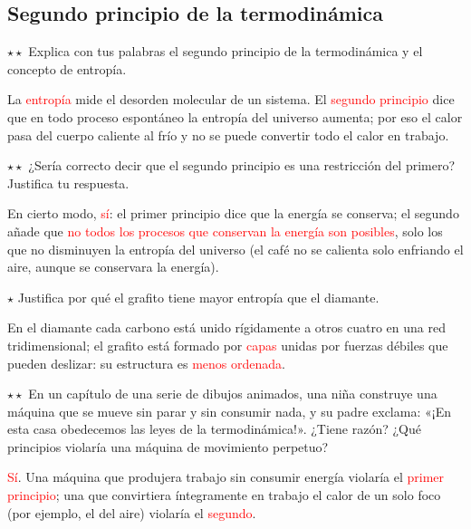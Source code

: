\subsection{Segundo principio de la termodinámica}

\begin{exercise}
    \(\star\star\) Explica con tus palabras el segundo principio de la termodinámica y el concepto de entropía.
    \begin{solu}
        La \textcolor{red}{entropía} mide el desorden molecular de un sistema. El \textcolor{red}{segundo principio} dice que en todo
        proceso espontáneo la entropía del universo aumenta; por eso el calor pasa del cuerpo caliente al frío y no se puede convertir
        todo el calor en trabajo.
    \end{solu}
\end{exercise}

\begin{exercise}
    \(\star\star\) ¿Sería correcto decir que el segundo principio es una restricción del primero? Justifica tu respuesta.
    \begin{solu}
        En cierto modo, \textcolor{red}{sí}: el primer principio dice que la energía se conserva; el segundo añade que
        \textcolor{red}{no todos los procesos que conservan la energía son posibles}, solo los que no disminuyen la entropía del
        universo (el café no se calienta solo enfriando el aire, aunque se conservara la energía).
    \end{solu}
\end{exercise}

\begin{exercise}
    \(\star\) Justifica por qué el grafito tiene mayor entropía que el diamante.
    \begin{solu}
        En el diamante cada carbono está unido rígidamente a otros cuatro en una red tridimensional; el grafito está formado por
        \textcolor{red}{capas} unidas por fuerzas débiles que pueden deslizar: su estructura es \textcolor{red}{menos ordenada}.
    \end{solu}
\end{exercise}

\begin{exercise}
    \(\star\star\) En un capítulo de una serie de dibujos animados, una niña construye una máquina que se mueve sin parar y sin
    consumir nada, y su padre exclama: «¡En esta casa obedecemos las leyes de la termodinámica!». ¿Tiene razón? ¿Qué principios
    violaría una máquina de movimiento perpetuo?
    \begin{solu}
        \textcolor{red}{Sí}. Una máquina que produjera trabajo sin consumir energía violaría el \textcolor{red}{primer principio}; una
        que convirtiera íntegramente en trabajo el calor de un solo foco (por ejemplo, el del aire) violaría el
        \textcolor{red}{segundo}.
    \end{solu}
\end{exercise}

